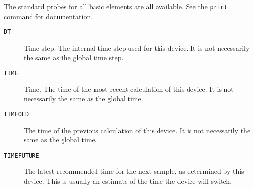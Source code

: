 The standard probes for all basic elements are all available.  See the
{\tt print} command for documentation.

\begin{description}
  
\item[{\tt DT}]
Time step.  The internal time step used for this device.  It is not
necessarily the same as the global time step.
  
\item[{\tt TIME}]
Time.  The time of the most recent calculation of this device.  It is
not necessarily the same as the global time.
  
\item[{\tt TIMEOLD}] 
The time of the previous calculation of this device.  It is not
necessarily the same as the global time.
  
\item[{\tt TIMEFUTURE}]
The latest recommended time for the next sample, as determined by this
device.  This is usually an estimate of the time the device will switch.

\end{description}
